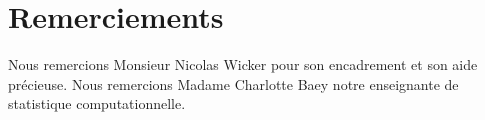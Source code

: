 \chapter*{Remerciements} 

Nous remercions Monsieur Nicolas Wicker pour son encadrement et son aide précieuse.
Nous remercions Madame Charlotte Baey notre enseignante de statistique computationnelle.

